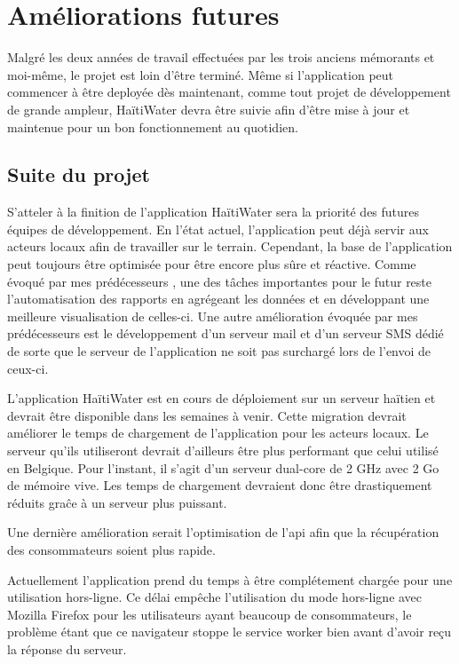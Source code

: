 \documentclass{EPL-master-thesis-covers-FR}
\begin{document}
				

	\chapter{Améliorations futures}
		Malgré les deux années de travail effectuées par les trois anciens mémorants \cite{ref:haitiwater} et moi-même, le projet est loin d'être terminé. Même si l'application peut commencer à être deployée dès maintenant, comme tout projet de développement de grande ampleur, HaïtiWater devra être suivie afin d'être mise à jour et maintenue pour un bon fonctionnement au quotidien. 

		\section{Suite du projet}
			\label{ref:suite_projet}
			S'atteler à la finition de l'application HaïtiWater sera la priorité des futures équipes de développement. En l'état actuel, l'application peut déjà servir aux acteurs locaux afin de travailler sur le terrain. Cependant, la base de l'application peut toujours être optimisée pour être encore plus sûre et réactive.		
			Comme évoqué par mes prédécesseurs \cite{ref:haitiwater}, une des tâches importantes pour le futur reste l'automatisation des rapports en agrégeant les données et en développant une meilleure visualisation de celles-ci. Une autre amélioration évoquée par mes prédécesseurs est le développement d'un serveur mail et d'un serveur SMS dédié de sorte que le serveur de l'application ne soit pas surchargé lors de l'envoi de ceux-ci.
			
			L'application HaïtiWater est en cours de déploiement sur un serveur haïtien et devrait être disponible dans les semaines à venir. Cette migration devrait améliorer le temps de chargement de l'application pour les acteurs locaux. Le serveur qu'ils utiliseront devrait d'ailleurs être plus performant que celui utilisé en Belgique. Pour l'instant, il s'agit d'un serveur dual-core de 2 GHz avec 2 Go de mémoire vive. Les temps de chargement devraient donc être drastiquement réduits graĉe à un serveur plus puissant. 
			
			Une dernière amélioration serait l'optimisation de l'\gls{api} afin que la récupération des consommateurs soient plus rapide.
		
			Actuellement l'application prend du temps à être complétement chargée pour une utilisation hors-ligne. Ce délai empêche l'utilisation du mode hors-ligne avec Mozilla Firefox pour les utilisateurs ayant beaucoup de consommateurs, le problème étant que ce navigateur stoppe le service worker bien avant d'avoir reçu la réponse du serveur.
					
\end{document}
